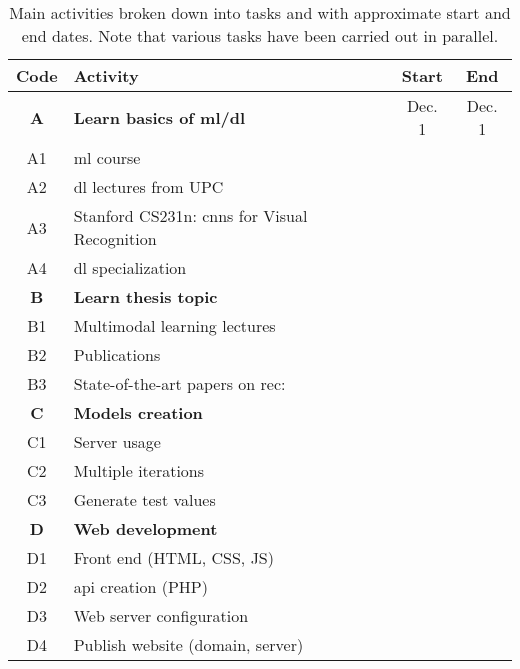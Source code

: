 \begin{table}[p]
  \centering
  \caption[Main activities broken down into tasks]{Main activities broken down
    into tasks and with approximate start and end dates. Note that various
    tasks have been carried out in parallel.}\label{tab:activities}
  \begin{tabular}{cp{}cc}
    \toprule

    \rowcolor{gray!37.5}
    \textbf{Code} & \textbf{Activity} & \textbf{Start} & \textbf{End} \\
    \midrule

    \rowcolor{rowColor}
    \textbf{A} & \textbf{Learn basics of \acs{ml}/\acs{dl}} & Dec. 1 & Dec. 1 \\
    \rowcolor{rowColor}
    A1 & \Acs{ml} course \cite{ng20:machin_learn} &  &  \\
    \rowcolor{rowColor} A2 & \Acs{dl} lectures from UPC
                             \cite{giro-i-nieto20:all_deep_learn_upc_etset_telec}
                                      &  &  \\
    \rowcolor{rowColor}
    A3 & Stanford CS231n: \acsp{cnn} for Visual Recognition \cite{li20:cs231} &  &  \\
    \rowcolor{rowColor}
    A4 & \Acs{dl} specialization \cite{ng20:deep_learn_special} &  &  \\
    \midrule

    \textbf{B} & \textbf{Learn thesis topic} &  &  \\
    B1 & Multimodal learning lectures \cite{giro-i-nieto20:all_deep_learn_upc_etset_telec} &  &  \\
    B2 & Publications & &  \\
    B3 & State-of-the-art papers on \acs{rec}: \cite{} & &  \\
    \midrule

    \rowcolor{rowColor}
    \textbf{C} & \textbf{Models creation} &  &  \\
    \rowcolor{rowColor} C1 & Server usage &  &  \\
    \rowcolor{rowColor} C2 & Multiple iterations &  &  \\
    \rowcolor{rowColor} C3 & Generate test values &  &  \\
    \midrule

    \textbf{D} & \textbf{Web development} & &  \\
    D1 & Front end (HTML, CSS, JS) & &  \\
    D2 & \Acs{api} creation (PHP) & &  \\
    D3 & Web server configuration & &  \\
    D4 & Publish website (domain, server) &  &  \\
    \midrule


\end{tabular}
\end{table}

